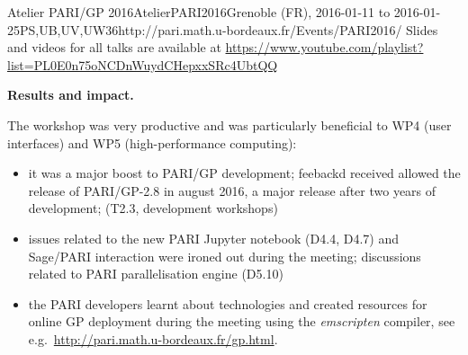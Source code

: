 \begin{event}{Atelier PARI/GP 2016}{AtelierPARI2016}{Grenoble (FR),
2016-01-11 to 2016-01-25}{PS,UB,UV,UW}{36}{http://pari.math.u-bordeaux.fr/Events/PARI2016/}
Slides and videos for all talks are available at
\url{https://www.youtube.com/playlist?list=PL0E0n75oNCDnWuydCHepxxSRc4UbtQQ}

\textbf{Results and impact.} 

The workshop was very productive and was particularly beneficial to WP4 (user
interfaces) and WP5 (high-performance computing):
\begin{itemize}
\item it was a major boost to PARI/GP development; feebackd received allowed
the release of PARI/GP-2.8 in august 2016, a major release after two years of
development; (T2.3, development workshops)

\item issues related to the new PARI Jupyter notebook (D4.4, D4.7) and
Sage/PARI interaction were ironed out during the meeting; discussions related
to PARI parallelisation engine (D5.10)

\item the PARI developers learnt about technologies and created resources for
online GP deployment during the meeting using the \emph{emscripten} compiler,
see e.g.~\url{http://pari.math.u-bordeaux.fr/gp.html}.
\end{itemize}

\end{event}
